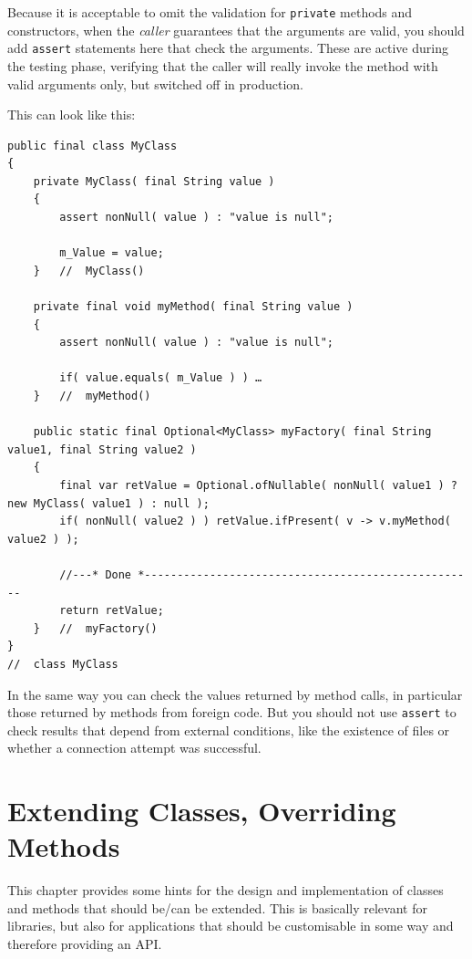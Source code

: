 Because it is acceptable to omit the validation for \lstinline|private| methods and constructors, when the \textit{caller} guarantees that the arguments are valid, you should add \lstinline|assert| statements here that check the arguments\autocite{ORACLE_DOC_ASSERTIONS}. These are active during the testing phase, verifying that the caller will really invoke the method with valid arguments only, but switched off in production.

This can look like this:
\begin{lstlisting}
public final class MyClass
{
    private MyClass( final String value )
    {
        assert nonNull( value ) : "value is null";
        
        m_Value = value;
    }   //  MyClass()
    
    private final void myMethod( final String value )
    {
        assert nonNull( value ) : "value is null";
        
        if( value.equals( m_Value ) ) …
    }   //  myMethod()
    
    public static final Optional<MyClass> myFactory( final String value1, final String value2 )
    {
    	final var retValue = Optional.ofNullable( nonNull( value1 ) ? new MyClass( value1 ) : null ); 
    	if( nonNull( value2 ) ) retValue.ifPresent( v -> v.myMethod( value2 ) );
    	
    	//---* Done *---------------------------------------------------
    	return retValue;
    }   //  myFactory()
}
//  class MyClass
\end{lstlisting}

In the same way you can check the values returned by method calls, in particular those returned by methods from foreign code. But you should not use \lstinline|assert| to check results that depend from external conditions, like the existence of files or whether a connection attempt was successful.


\section{Extending Classes, Overriding Methods}\label{sec:ExtendingClassesOverridingMethods}
This chapter provides some hints for the design and implementation of classes and methods that should be/can be extended. This is basically relevant for libraries, but also for applications that should be customisable in some way and therefore providing an API.

